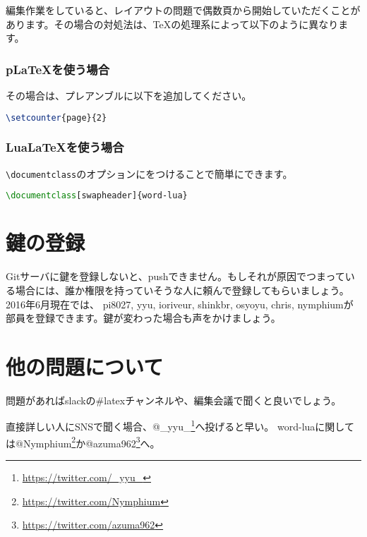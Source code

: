 \documentclass{word}
\begin{document}
編集作業をしていると、レイアウトの問題で偶数頁から開始していただくことがあります。その場合の対処法は、\TeX の処理系によって以下のように異なります。

\subsubsection{p\LaTeX を使う場合}

その場合は、プレアンブルに以下を追加してください。

\begin{lstlisting}[language=TeX, mathescape]
\setcounter{page}{2}
\end{lstlisting}

\subsubsection{Lua\LaTeX を使う場合}

\lstinline|\documentclass|のオプションにをつけることで簡単にできます。

\begin{lstlisting}[language=TeX, mathescape]
\documentclass[swapheader]{word-lua}
\end{lstlisting}

\section{鍵の登録}

Gitサーバに鍵を登録しないと、pushできません。もしそれが原因でつまっている場合には、誰か権限を持っていそうな人に頼んで登録してもらいましょう。2016年6月現在では、
pi8027, yyu, ioriveur, shinkbr, osyoyu, chris, nymphiumが部員を登録できます。鍵が変わった場合も声をかけましょう。

\section{他の問題について}

問題があればslackの\#latexチャンネルや、編集会議で聞くと良いでしょう。

直接詳しい人にSNSで聞く場合、@\_yyu\_\footnote{\url{https://twitter.com/_yyu_}}へ投げると早い。
word-luaに関しては@Nymphium\footnote{\url{https://twitter.com/Nymphium}}か@azuma962\footnote{\url{https://twitter.com/azuma962}}へ。
\end{document}
